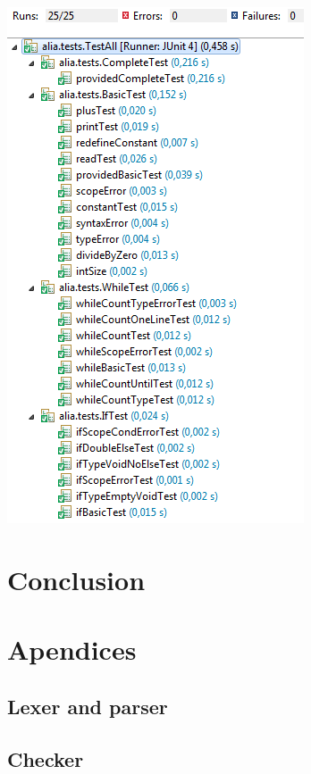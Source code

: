 \documentclass[paper=a4, fontsize=11pt]{article}
\numberwithin{equation}{section}		%
\numberwithin{figure}{section}			%
\numberwithin{table}{section}				%
\begin{document}
\begin{center}
\includegraphics[scale=0.5]{images/testresults.png}
\end{center}



\section{Conclusion}

\newpage
\appendix
{}
\section{Apendices}

\subsection{Lexer and parser}



\subsection{Checker}
\end{document}

